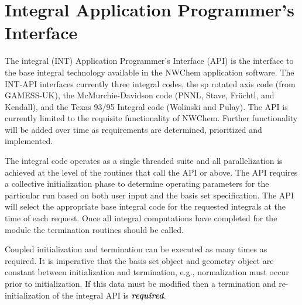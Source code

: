 %
%
\chapter{Integral Application Programmer's Interface} 
The integral (INT) Application Programmer's Interface (API) is the 
interface to the base integral technology available in the NWChem 
application software.  The INT-API interfaces currently three integral 
codes, the sp rotated axis code (from GAMESS-UK), the 
McMurchie-Davidson code (PNNL, Stave, Fr\"uchtl, and Kendall), and the 
Texas 93/95 Integral code (Wolinski and Pulay).  The API is currently 
limited to the requisite functionality of NWChem.  Further 
functionality will be added over time as requirements are determined, 
prioritized and implemented.   
 
The integral code operates as a single threaded suite and all 
parallelization is achieved at the level of the routines that call the 
API or above.  The API requires a collective initialization phase to 
determine operating parameters for the particular run based on both 
user input and the basis set specification.  The API will select the 
appropriate base integral code for the requested integrals at the time 
of each request.  Once all integral computations have completed for 
the module the termination routines should be called.   
 
Coupled initialization and termination can be executed as many times 
as required. It is imperative that the basis set object and geometry 
object are constant between initialization and termination, e.g., 
normalization must occur prior to initialization.  If this data must 
be modified then a termination and re-initialization of the integral 
API is {\bf{\it required}}. 
 
